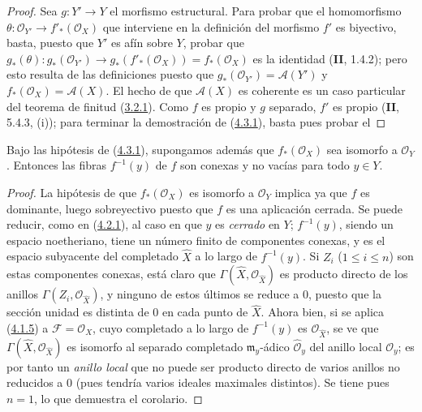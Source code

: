 \begin{proof}
Sea $g:Y'\to Y$ el morfismo estructural. Para probar que el homomorfismo
$\theta:\mathcal O_{Y'}\to f'_*(\mathcal O_X)$ que interviene en la definición
del morfismo $f'$ es biyectivo, basta, puesto que $Y'$ es afín sobre $Y$,
probar que
$g_*(\theta):g_*(\mathcal O_{Y'})\longrightarrow
g_*(f'_*(\mathcal O_X))=f_*(\mathcal O_X)$
es la identidad (\textbf{II}, 1.4.2); pero esto resulta de las definiciones puesto que
$g_*(\mathcal O_{Y'})=\mathcal A(Y')$ y
$f_*(\mathcal O_X)=\mathcal A(X)$. El hecho de que $\mathcal A(X)$ es
coherente es un caso particular del teorema de finitud
(\hyperref[III.3.2.1-fr]{3.2.1}). Como $f$ es propio y $g$ separado,
$f'$ es propio (\textbf{II}, 5.4.3, (i)); para terminar la demostración de
(\hyperref[III.4.3.1-fr]{4.3.1}), basta pues probar el
\end{proof}

\begin{corollary}[4.3.2]
\label{III.4.3.2-fr}
Bajo las hipótesis de \textup{(\hyperref[III.4.3.1-fr]{4.3.1})}, supongamos además
que $f_*(\mathcal O_X)$ sea isomorfo a $\mathcal O_Y$. Entonces las fibras
$f^{-1}(y)$ de $f$ son conexas y no vacías para todo $y\in Y$.
\end{corollary}

\begin{proof}
La hipótesis de que $f_*(\mathcal O_X)$ es isomorfo a $\mathcal O_Y$
implica ya que $f$ es dominante, luego sobreyectivo puesto que $f$ es una
aplicación cerrada. Se puede reducir, como en
(\hyperref[III.4.2.1-fr]{4.2.1}), al caso en que $y$ es \emph{cerrado} en $Y$;
$f^{-1}(y)$, siendo un espacio noetheriano, tiene un número finito de componentes
conexas, y es el espacio subyacente del completado $\widehat X$ a lo largo de
$f^{-1}(y)$. Si $Z_i$ ($1\leq i\leq n$) son estas componentes conexas, está
claro que $\Gamma(\widehat X,\mathcal O_{\widehat X})$ es producto
directo de los anillos $\Gamma(Z_i,\mathcal O_{\widehat X})$, y ninguno de estos
últimos se reduce a $0$, puesto que la sección unidad es distinta de
$0$ en cada punto de $\widehat X$. Ahora bien, si se aplica
(\hyperref[III.4.1.5-fr]{4.1.5}) a $\mathcal F=\mathcal O_X$, cuyo
completado a lo largo de $f^{-1}(y)$ es $\mathcal O_{\widehat X}$, se ve que
$\Gamma(\widehat X,\mathcal O_{\widehat X})$ es isomorfo al separado
completado $\mathfrak m_y$-ádico $\widehat{\mathcal O}_y$ del anillo local
$\mathcal O_y$; es por tanto un \emph{anillo local} que no puede ser producto
directo de varios anillos no reducidos a $0$ (pues tendría
varios ideales maximales distintos). Se tiene pues $n=1$, lo que demuestra el
corolario.
\end{proof}

